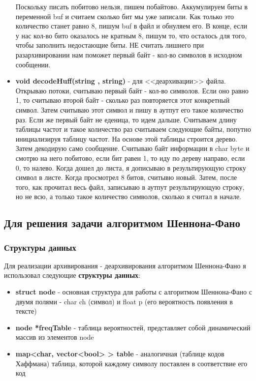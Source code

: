 \documentclass[russian, a4paper, 12pt]{article}
\begin{document}
\begin{itemize}
  Поскольку писать побитово нельзя, пишем побайтово. Аккумулируем биты в переменной
  buf и считаем сколько бит мы уже записали.
  Как только это количество станет равно 8, пишум buf в файл и обнуляем его.
  В конце, если у нас кол-во бито оказалось не кратным 8,
  пишум то, что осталось для того, чтобы заполнить недостающие биты.
  НЕ считать лишнего при разархивировании нам поможет первый байт -
  кол-во символов в исходном сообщении.
  \item \textbf{void decodeHuff(string , string)} - для <<деархивации>> файла.
  Открываю потоки, считываю первый байт - кол-во символов. Если оно равно
  1, то считываю второй байт - сколько раз повторяется этот конкретный символ.
  Затем считываю этот символ и пишу в аутпут его такое
  количество раз. Если же первый байт не еденица, то идем дальше. Считываем
  длину таблицы частот и такое количество раз считываем
  следующие байты, попутно инициализируя таблицу частот. На основе этой таблицы
  строится дерево. Затем декодирую само сообщение.
  Считываю байт информации в char byte и смотрю на него побитово, если бит равен
  1, то иду по дереву направо, если 0, то налево.
  Когда дошел до листа, я дописываю в результирующую строку символ в листе.
  Когда просмотрел 8 битов, считывю новый.
  Затем, после того, как прочитал весь файл, записываю в аутпут результирующую
  строку, но не всю, а только такое количество символов,
  сколько я считал в начале.
\end{itemize}

\subsection{Для решения задачи алгоритмом Шеннона-Фано}
\subsubsection{Структуры данных}
Для реализации архивирования - деархивирования алгоритмом Шеннона-Фано я использовал
следующие \textbf{структуры данных}:
\begin{itemize}
  \item \textbf{struct node} - основная структура для работы с алгоритмом
  Шеннона-Фано с двумя полями - char ch (символ) и float p (его
  вероятность появления в тексте)
  \item \textbf{node *freqTable} - таблица вероятностей, представляет собой
  динамический массив из элементов node
  \item \textbf{map<char, vector<bool> > table} - аналогичная (таблице кодов Хаффмана)
  таблица, которой каждому символу
  поставлен в соответствие его код
\end{itemize}
\end{document}
